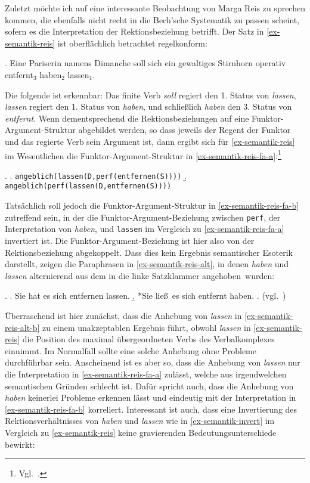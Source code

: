 Zuletzt möchte ich auf eine interessante Beobachtung von Marga Reis \citep{Reis:79} zu sprechen kommen, die ebenfalls nicht recht in die Bech'sche Systematik zu passen scheint, sofern es die Interpretation der Rektionsbeziehung betrifft. Der Satz in \ref{ex-semantik-reis} ist oberflächlich betrachtet regelkonform:
{
\ex. \label{ex-semantik-reis} Eine Pariserin namens Dimanche soll sich ein gewaltiges Stirnhorn operativ entfernt$_3$ haben$_2$ lassen$_1$. \hfill \citep[15]{Reis:79}

}
\noindent Die folgende  ist erkennbar: Das finite Verb {\it soll} regiert den 1. Status von {\it lassen}, {\it lassen} regiert den 1. Status von {\it haben}, und schlie\ss lich {\it haben} den 3. Status von {\it entfernt}. Wenn dementsprechend die Rektionsbeziehungen auf eine Funktor-Argument-Struktur abgebildet werden, so dass jeweils der Regent der Funktor und das regierte Verb sein Argument ist, dann ergibt sich für \ref{ex-semantik-reis} im Wesentlichen die Funktor-Argument-Struktur in \ref{ex-semantik-reis-fa-a}:\footnote{Vgl.\ \citet[(159)]{Meurers:99}.}

\ex. 
\a. {\tt angeblich(lassen(D,perf(entfernen(S))))} \label{ex-semantik-reis-fa-a}
\b. {\tt angeblich(perf(lassen(D,entfernen(S))))} \label{ex-semantik-reis-fa-b}   

Tatsächlich soll jedoch die Funktor-Argument-Struktur in \ref{ex-semantik-reis-fa-b} zutreffend sein, in der die Funktor-Argument-Beziehung zwischen {\tt perf}, der Interpretation von {\it haben}, und {\tt lassen} im Vergleich zu \ref{ex-semantik-reis-fa-a} invertiert ist. Die Funktor-Argument-Beziehung ist hier also von der Rektionsbeziehung abgekoppelt. Dass dies kein Ergebnis semantischer Esoterik darstellt, zeigen die Paraphrasen in \ref{ex-semantik-reis-alt}, in denen {\it haben} und {\it lassen} alternierend aus dem  in die linke Satzklammer \glqq angehoben\grqq\ wurden: 
  
\ex. \label{ex-semantik-reis-alt}
\a. Sie hat es sich entfernen lassen. \label{ex-semantik-reis-alt-a}
\b. *Sie lie\ss \ es sich entfernt haben. \label{ex-semantik-reis-alt-b}
\z. (vgl.\ \citealt[(160)]{Meurers:99})

Überraschend ist hier zunächst, dass die Anhebung von {\it lassen} in \ref{ex-semantik-reis-alt-b} zu einem unakzeptablen Ergebnis führt, obwohl {\it lassen} in \ref{ex-semantik-reis} die Position des maximal übergeordneten Verbs des Verbalkomplexes einnimmt. Im Normalfall sollte eine solche Anhebung ohne Probleme durchführbar sein. Anscheinend ist es aber so, dass die Anhebung von {\it lassen} nur die Interpretation in \ref{ex-semantik-reis-fa-a} zulässt, welche aus irgendwelchen semantischen Gründen schlecht ist. Dafür spricht auch, dass die Anhebung von {\it haben} keinerlei Probleme erkennen lässt und eindeutig mit der Interpretation in \ref{ex-semantik-reis-fa-b} korreliert. Interessant ist auch, dass eine Invertierung des Rektionsverhältnisses von {\it haben} und {\it lassen} wie in \ref{ex-semantik-invert} im Vergleich zu \ref{ex-semantik-reis} keine gravierenden Bedeutungsunterschiede bewirkt:   

